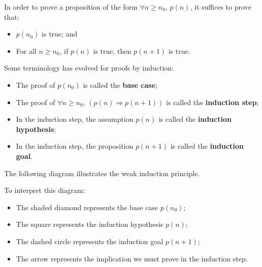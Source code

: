 \begin{strategy}
In order to prove a proposition of the form $\forall n \ge n_0,\, p(n)$, it suffices to prove that:
\begin{itemize}
\item $p(n_0)$ is true; and
\item For all $n \ge n_0$, if $p(n)$ is true, then $p(n+1)$ is true.
\end{itemize}
Some terminology has evolved for proofs by induction:
\begin{itemize}
\item The proof of $p(n_0)$ is called the \textbf{base case};
\item The proof of $\forall n \ge n_0,\, (p(n) \Rightarrow p(n+1))$ is called the \textbf{induction step};
\item In the induction step, the assumption $p(n)$ is called the \textbf{induction hypothesis};
\item In the induction step, the proposition $p(n+1)$ is called the \textbf{induction goal}.
\end{itemize}
\end{strategy}

The following diagram illustrates the weak induction principle.

\begin{center}
\end{center}

To interpret this diagram:
\begin{itemize}
\item The shaded diamond represents the base case $p(n_0)$;
\item The square represents the induction hypothesis $p(n)$;
\item The dashed circle represents the induction goal $p(n+1)$;
\item The arrow represents the implication we must prove in the induction step.
\end{itemize}

